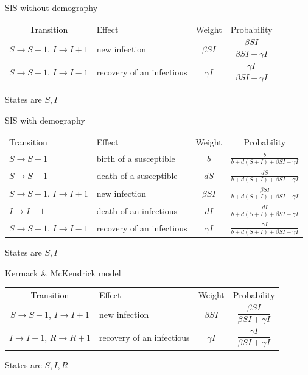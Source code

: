 \documentclass[aspectratio=169]{beamer}
\begin{document}
\begin{frame}{SIS without demography}
    \begin{center}
        \begin{tabular}{cp{3cm}cc}
            Transition & Effect & Weight & Probability \\
            $S\to S-1$, $I\to I+1$ & new infection & $\beta SI$ & $\dfrac{\beta SI}{\beta SI+\gamma I}$ \\
            $S\to S+1$, $I\to I-1$ & recovery of an infectious & $\gamma I$ & $\dfrac{\gamma I}{\beta SI+\gamma I}$
        \end{tabular}
    \end{center}
    \vfill
    States are $S,I$
\end{frame}


\begin{frame}{SIS with demography}
    \begin{center}
        \begin{tabular}{p{3cm}p{3cm}cc}
            Transition & Effect & Weight & Probability \\
            $S\to S+1$ & birth of a susceptible & $b$ & $\frac{b}{b+d(S+I)+\beta SI+\gamma I}$ \\
            $S\to S-1$ & death of a susceptible & $dS$ & $\frac{dS}{b+d(S+I)+\beta SI+\gamma I}$ \\
            $S\to S-1$, $I\to I+1$ & new infection & $\beta SI$ & $\frac{\beta SI}{b+d(S+I)+\beta SI+\gamma I}$ \\
            $I\to I-1$ & death of an infectious & $dI$ & $\frac{dI}{b+d(S+I)+\beta SI+\gamma I}$ \\
            $S\to S+1$, $I\to I-1$ & recovery of an infectious & $\gamma I$ & $\frac{\gamma I}{b+d(S+I)+\beta SI+\gamma I}$ 
        \end{tabular}
    \end{center}
\vfill
States are $S,I$
\end{frame}


\begin{frame}[fragile]{Kermack \& McKendrick model}
    \begin{center}
        \begin{tabular}{cp{3cm}cc}
            Transition & Effect & Weight & Probability \\
            $S\to S-1$, $I\to I+1$ & new infection & $\beta SI$ & $\dfrac{\beta SI}{\beta SI+\gamma I}$ \\
            $I\to I-1$, $R\to R+1$ & recovery of an infectious & $\gamma I$ & $\dfrac{\gamma I}{\beta SI+\gamma I}$ 
        \end{tabular}
    \end{center}
    \vfill
    States are $S,I,R$
\end{frame}
\end{document}

